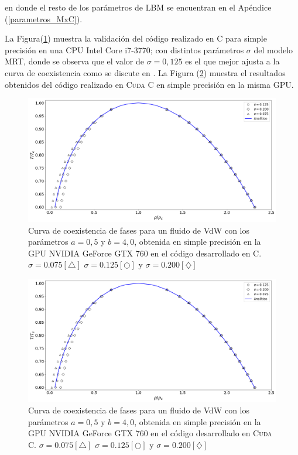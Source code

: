 en donde el resto de los parámetros de LBM se encuentran en el Apéndice (\ref{parametros_MxC}).

La Figura(\ref{fig:v_760_MxC_c_simple}) muestra la validación del código realizado en \textsc{C} para simple precisión en una CPU Intel Core i7-3770; con distintos parámetros $\sigma$ del modelo MRT, donde se observa que el valor de $\sigma = 0,125$ es el que mejor ajusta a la curva de coexistencia como se discute en \cite{fogliatto2018modelado}. La Figura (\ref{fig:v_760_MxC_cuda_simple}) muestra el resultados obtenidos del código realizado en \textsc{Cuda C} en simple precisión en la misma GPU.

\begin{figure}[htbp]
	\centering
	\includegraphics[width=\textwidth]{figs/cap4/v_760_MxC_c_simple}
	\caption{Curva de coexistencia de fases para un fluido de VdW con los parámetros $a = 0,5 $ y $b = 4,0 $, obtenida en simple precisión en la GPU NVIDIA GeForce GTX 760 en el código desarrollado en \textsc{C}. $\sigma = 0.075[\bigtriangleup]$	 $\sigma = 0.125[\bigcirc]$ y $\sigma = 0.200[\diamondsuit]$ }
 	\label{fig:v_760_MxC_c_simple}	
\end{figure}

\begin{figure}[htbp]
	\centering
	\includegraphics[width=\textwidth]{figs/cap4/v_760_MxC_cuda_simple}
	\caption{Curva de coexistencia de fases para un fluido de VdW con los parámetros $a = 0,5 $ y $b = 4,0 $, obtenida en simple precisión en la GPU NVIDIA GeForce GTX 760 en el código desarrollado en \textsc{Cuda C}. $\sigma = 0.075[\bigtriangleup]$	 $\sigma = 0.125[\bigcirc]$ y $\sigma = 0.200[\diamondsuit]$ }
	\label{fig:v_760_MxC_cuda_simple}	
\end{figure}

